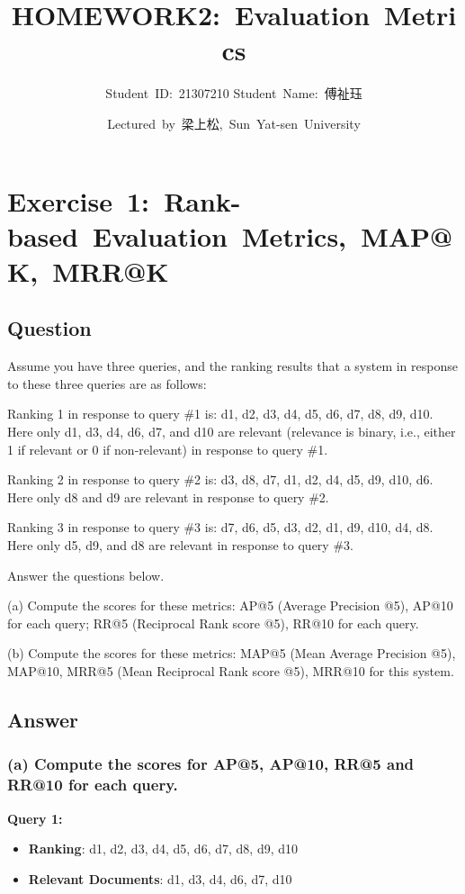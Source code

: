 \documentclass[a4paper, utf8]{ctexart}
\title{\songti \Large \textbf{HOMEWORK2:\ Evaluation\ Metrics}}
\author{Student\ ID:\ 21307210 \qquad Student\ Name:\ 傅祉珏}
\date{Lectured\ by\ 梁上松,\ Sun\ Yat-sen\ University}
\begin{document}
	
	\maketitle
	
	\section{Exercise\ 1:\ Rank-based\ Evaluation\ Metrics,\ MAP@K,\ MRR@K}
	
	\subsection{Question}
	
	Assume you have three queries, and the ranking results that a system in response to these three queries are as follows:
	
	Ranking 1 in response to query \#1 is: d1, d2, d3, d4, d5, d6, d7, d8, d9, d10. Here only d1, d3, d4, d6, d7, and d10 are relevant (relevance is binary, i.e., either 1 if relevant or 0 if non-relevant) in response to query \#1.
	
	Ranking 2 in response to query \#2 is: d3, d8, d7, d1, d2, d4, d5, d9, d10, d6. Here only d8 and d9 are relevant in response to query \#2.
	
	Ranking 3 in response to query \#3 is: d7, d6, d5, d3, d2, d1, d9, d10, d4, d8. Here only d5, d9, and d8 are relevant in response to query \#3.
	
	Answer the questions below.
	
	(a) Compute the scores for these metrics: AP@5 (Average Precision @5), AP@10 for each query; RR@5 (Reciprocal Rank score @5), RR@10 for each query.
	
	(b) Compute the scores for these metrics: MAP@5 (Mean Average Precision @5), MAP@10, MRR@5 (Mean Reciprocal Rank score @5), MRR@10 for this system.
	
	\subsection{Answer}
	
	\subsubsection*{(a) Compute the scores for AP@5, AP@10, RR@5 and RR@10 for each query.}
	
	\textbf{Query 1:}
	
	\begin{itemize}[itemsep=2pt, topsep=0pt, parsep=0pt]
	    \item \textbf{Ranking}: d1, d2, d3, d4, d5, d6, d7, d8, d9, d10
	    \item \textbf{Relevant Documents}: d1, d3, d4, d6, d7, d10
	\end{itemize}
	
\end{document}
